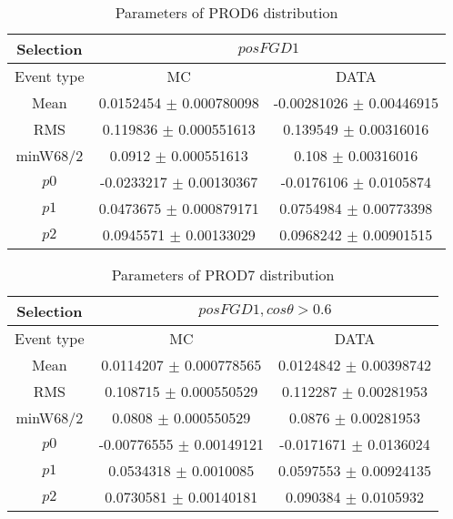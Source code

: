 \documentclass[a4paper,12pt]{article}
\begin{document}
\begin{table}[htbp]
\begin{center}
\begin{tabular}{|c|c|c|}
        \hline
        Selection & \multicolumn{2}{|c|}{$posFGD1$}  \\ \hline
        Event type & MC & DATA \\ 
        \hline
        Mean & 0.0152454 $\pm$ 0.000780098 & -0.00281026 $\pm$ 0.00446915 \\ 
        \hline 
        RMS & 0.119836 $\pm$ 0.000551613 & 0.139549 $\pm$ 0.00316016 \\ 
        \hline 
        minW68/2 & 0.0912 $\pm$ 0.000551613 & 0.108 $\pm$ 0.00316016 \\ 
        \hline 
        $p0$ & -0.0233217 $\pm$ 0.00130367 & -0.0176106 $\pm$ 0.0105874 \\ 
        \hline 
        $p1$ & 0.0473675 $\pm$ 0.000879171 & 0.0754984 $\pm$ 0.00773398 \\ 
        \hline 
        $p2$ & 0.0945571 $\pm$ 0.00133029 & 0.0968242 $\pm$ 0.00901515 \\ 
        \hline 
\end{tabular}
\caption{Parameters of PROD6 distribution } \vspace{0.2in}
\label{xxx}
\end{center}
\end{table}

\begin{table}[htbp]
\begin{center}
\begin{tabular}{|c|c|c|}
        \hline
        Selection & \multicolumn{2}{|c|}{$posFGD1, cos\theta>0.6$}  \\ \hline
        Event type & MC & DATA \\ 
        \hline
        Mean & 0.0114207 $\pm$ 0.000778565 & 0.0124842 $\pm$ 0.00398742 \\ 
        \hline 
        RMS & 0.108715 $\pm$ 0.000550529 & 0.112287 $\pm$ 0.00281953 \\ 
        \hline 
        minW68/2 & 0.0808 $\pm$ 0.000550529 & 0.0876 $\pm$ 0.00281953 \\ 
        \hline 
        $p0$ & -0.00776555 $\pm$ 0.00149121 & -0.0171671 $\pm$ 0.0136024 \\ 
        \hline 
        $p1$ & 0.0534318 $\pm$ 0.0010085 & 0.0597553 $\pm$ 0.00924135 \\ 
        \hline 
        $p2$ & 0.0730581 $\pm$ 0.00140181 & 0.090384 $\pm$ 0.0105932 \\ 
        \hline 
\end{tabular}
\caption{Parameters of PROD7 distribution } \vspace{0.2in}
\label{xxx}
\end{center}
\end{table}
\end{document}
